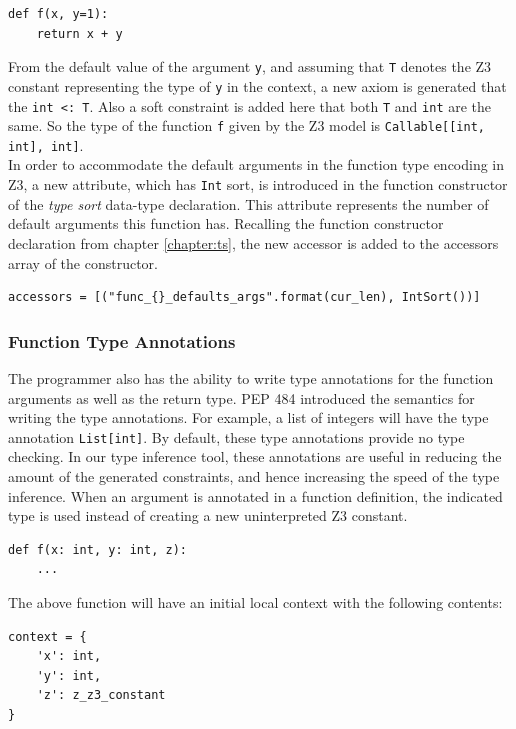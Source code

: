 \begin{lstlisting}
def f(x, y=1):
	return x + y
\end{lstlisting}

From the default value of the argument \lstinline|y|, and assuming that \lstinline|T| denotes the Z3 constant representing the type of \lstinline|y| in the context, a new axiom is generated that the \lstinline|int <: T|. Also a soft constraint is added here that both \lstinline|T| and \lstinline|int| are the same. So the type of the function \lstinline|f| given by the Z3 model is \lstinline|Callable[[int, int], int]|.\\

In order to accommodate the default arguments in the function type encoding in Z3, a new attribute, which has \lstinline|Int| sort, is introduced in the function constructor of the \textit{type sort} data-type declaration. This attribute represents the number of default arguments this function has. Recalling the function constructor declaration from chapter \ref{chapter:ts}, the new accessor is added to the accessors array of the constructor.
\begin{lstlisting}
accessors = [("func_{}_defaults_args".format(cur_len), IntSort())]
\end{lstlisting}

\subsubsection{Function Type Annotations}
The programmer also has the ability to write type annotations for the function arguments as well as the return type. PEP 484 \cite{484} introduced the semantics for writing the type annotations. For example, a list of integers will have the type annotation \lstinline|List[int]|. By default, these type annotations provide no type checking. In our type inference tool, these annotations are useful in reducing the amount of the generated constraints, and hence increasing the speed of the type inference. When an argument is annotated in a function definition, the indicated type is used instead of creating a new uninterpreted Z3 constant.
\begin{lstlisting}
def f(x: int, y: int, z):
	...
\end{lstlisting}

The above function will have an initial local context with the following contents:
\begin{lstlisting}
context = {
	'x': int,
	'y': int,
	'z': z_z3_constant
}
\end{lstlisting}

